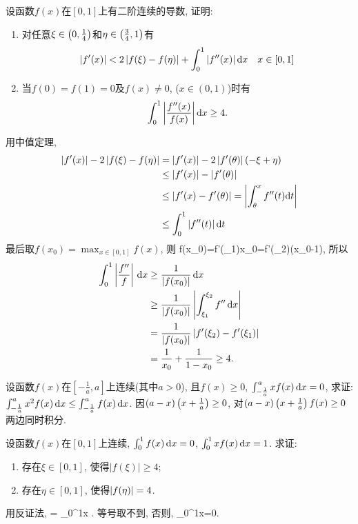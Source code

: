 \bq{}{}
设函数$f(x)$在$[0,1]$上有二阶连续的导数, 证明:
\begin{enumerate}
\item 对任意$\xi\in\left(0,\frac{1}{4}\right)$和$\eta\in\left(\frac{3}{4},1\right)$有
\[
\left\lvert f'(x)\right\rvert<2\left\lvert f(\xi)-f(\eta)\right\rvert+\int_{0}^{1}\left\lvert f''(x)\right\rvert\mathrm{d}x\quad x\in[0,1]
\]
\item 当$f(0)=f(1)=0$及$f(x)\ne0$, ($x\in(0,1)$)时有
\[
\int_{0}^{1}\left\lvert\frac{f''(x)}{f(x)}\right\rvert\mathrm{d}x\ge4.
\]
\end{enumerate}
\eq
\ba
用中值定理, 
\begin{align*}
\left\lvert f'(x)\right\rvert-2\left\lvert f(\xi)-f(\eta)\right\rvert & =\left\lvert f'(x)\right\rvert-2\left\lvert f'(\theta)\right\rvert(-\xi+\eta)\\
 & \le\left\lvert f'(x)\right\rvert-\left\lvert f'(\theta)\right\rvert\\
 & \le\left\lvert f'(x)-f'(\theta)\right\rvert=\left\lvert\int_{\theta}^{x}f''(t)\mathrm{d}t\right\rvert\\
 & \le\int_{0}^{1}\left\lvert f''(t)\right\rvert\mathrm{d}t
\end{align*}
最后取$f(x_{0})=\max_{x\in[0,1]}f(x)$, 则
\bee
f(x_0)=f'(\xi_1)x_0=f'(\xi_2)(x_0-1),
\eee
所以
\begin{align*}
\int_0^1\left\lvert\frac{f''}{f}\right\rvert\,\mathrm{d} x & \ge\frac1{\left\lvert f(x_0)\right\rvert}\,\mathrm{d} x\\
 & \ge \frac1{\left\lvert f(x_0)\right\rvert}\left\lvert\int_{\xi_1}^{\xi_2}f''\,\mathrm{d} x\right\rvert\\
 & = \frac{1}{\left\lvert f(x_0)\right\rvert}\left\lvert f'(\xi_2)-f'(\xi_1)\right\rvert\\
 & = \frac1{x_0}+\frac1{1-x_0}\ge4.
\end{align*}
\ea

\bq{}{}
设函数$f(x)$在$\left[-\frac1a,a\right]$上连续(其中$a>0$), 且$f(x)\ge0$, $\int_{-\frac1a}^{a}xf(x)\,\mathrm{d} x=0$, 求证: $\int_{-\frac1a}^ax^2f(x)\,\mathrm{d} x\le\int_{-\frac1a}^af(x)\,\mathrm{d} x$.
\eq
\ba
因$(a-x)\left(x+\frac1a\right)\ge0$, 对$(a-x)\left(x+\frac1a\right)f(x)\ge0$两边同时积分.
\ea

\bq{}{}
设函数$f(x)$在$[0,1]$上连续, $\int_0^1f(x)\,\mathrm{d} x=0$, $\int_0^1xf(x)\,\mathrm{d} x=1$. 求证: 
\begin{enumerate}[1.]
 \item 存在$\xi\in[0,1]$, 使得$|f(\xi)|\ge4$;
 \item 存在$\eta\in[0,1]$, 使得$\left\lvert f(\eta)\right\rvert=4$.
\end{enumerate}
\eq
\ba
用反证法, 
=
  \le \int_0^1\cdot{}\ud x
  .
\eee
等号取不到, 否则, 
\bee
\int_0^1\ud x=0.
\eee
\ea

